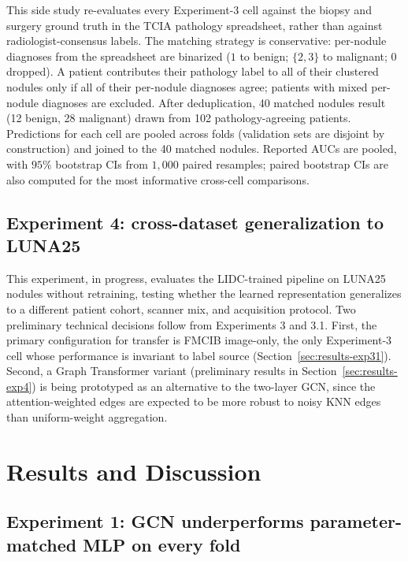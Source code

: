 \documentclass[10pt,letterpaper,twocolumn]{article}
\begin{document}
This side study re-evaluates every Experiment-3 cell against the biopsy and surgery ground truth in the TCIA pathology spreadsheet, rather than against radiologist-consensus labels. The matching strategy is conservative: per-nodule diagnoses from the spreadsheet are binarized ($1$ to benign; $\{2, 3\}$ to malignant; $0$ dropped). A patient contributes their pathology label to all of their clustered nodules only if all of their per-nodule diagnoses agree; patients with mixed per-nodule diagnoses are excluded. After deduplication, 40 matched nodules result (12 benign, 28 malignant) drawn from 102 pathology-agreeing patients. Predictions for each cell are pooled across folds (validation sets are disjoint by construction) and joined to the 40 matched nodules. Reported AUCs are pooled, with $95\%$ bootstrap CIs from $1{,}000$ paired resamples; paired bootstrap CIs are also computed for the most informative cross-cell comparisons.

\subsection{Experiment 4: cross-dataset generalization to LUNA25}

This experiment, in progress, evaluates the LIDC-trained pipeline on LUNA25 nodules without retraining, testing whether the learned representation generalizes to a different patient cohort, scanner mix, and acquisition protocol. Two preliminary technical decisions follow from Experiments 3 and 3.1. First, the primary configuration for transfer is FMCIB image-only, the only Experiment-3 cell whose performance is invariant to label source (Section~\ref{sec:results-exp31}). Second, a Graph Transformer variant (preliminary results in Section~\ref{sec:results-exp4}) is being prototyped as an alternative to the two-layer GCN, since the attention-weighted edges are expected to be more robust to noisy KNN edges than uniform-weight aggregation.

\section{Results and Discussion}
\label{sec:results}

\subsection{Experiment 1: GCN underperforms parameter-matched MLP on every fold}
\label{sec:results-exp1}
\end{document}
